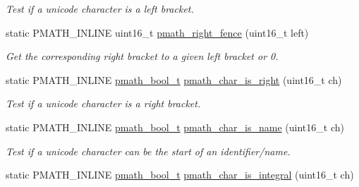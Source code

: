 \begin{CompactItemize}
\begin{CompactList}\small\item\em Test if a unicode character is a left bracket. \item\end{CompactList}\item 
\hypertarget{group__parser_gb755765b5bed512588951cc1030f5b61}{
static PMATH\_\-INLINE uint16\_\-t \hyperlink{group__parser_gb755765b5bed512588951cc1030f5b61}{pmath\_\-right\_\-fence} (uint16\_\-t left)}
\label{group__parser_gb755765b5bed512588951cc1030f5b61}

\begin{CompactList}\small\item\em Get the corresponding right bracket to a given left bracket or 0. \item\end{CompactList}\item 
\hypertarget{group__parser_gfdad3ad70ce3461ddd7c5c3e866fcda5}{
static PMATH\_\-INLINE \hyperlink{group__general__types_gc92090cb0b56345d6c379ed2341d4ef4}{pmath\_\-bool\_\-t} \hyperlink{group__parser_gfdad3ad70ce3461ddd7c5c3e866fcda5}{pmath\_\-char\_\-is\_\-right} (uint16\_\-t ch)}
\label{group__parser_gfdad3ad70ce3461ddd7c5c3e866fcda5}

\begin{CompactList}\small\item\em Test if a unicode character is a right bracket. \item\end{CompactList}\item 
\hypertarget{group__parser_gd39390fd630dd8babeacce5fbfe30894}{
static PMATH\_\-INLINE \hyperlink{group__general__types_gc92090cb0b56345d6c379ed2341d4ef4}{pmath\_\-bool\_\-t} \hyperlink{group__parser_gd39390fd630dd8babeacce5fbfe30894}{pmath\_\-char\_\-is\_\-name} (uint16\_\-t ch)}
\label{group__parser_gd39390fd630dd8babeacce5fbfe30894}

\begin{CompactList}\small\item\em Test if a unicode character can be the start of an identifier/name. \item\end{CompactList}\item 
\hypertarget{group__parser_g6e663a257aacaa8f61bc1654a90247a8}{
static PMATH\_\-INLINE \hyperlink{group__general__types_gc92090cb0b56345d6c379ed2341d4ef4}{pmath\_\-bool\_\-t} \hyperlink{group__parser_g6e663a257aacaa8f61bc1654a90247a8}{pmath\_\-char\_\-is\_\-integral} (uint16\_\-t ch)}
\label{group__parser_g6e663a257aacaa8f61bc1654a90247a8}


\end{CompactItemize}

